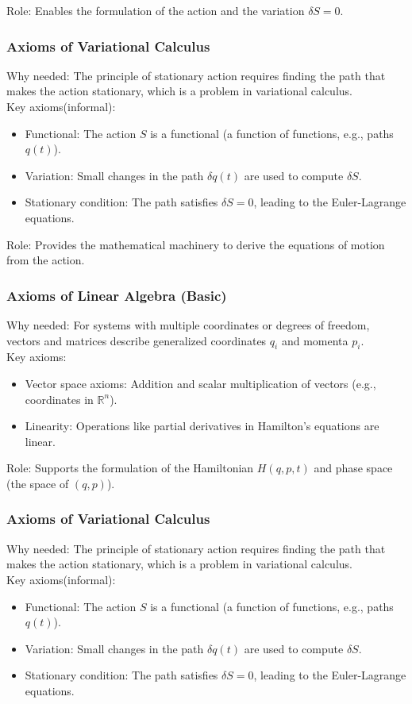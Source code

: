 Role: Enables the formulation of the action and the variation $ \delta S = 0 $.
\subsubsection{Axioms of Variational Calculus}
Why needed: The principle of stationary action requires finding the path that makes the action stationary, which is a problem in variational calculus.
\\
Key axioms(informal):
\begin{itemize}
    \item Functional: The action $ S $ is a functional (a function of functions, e.g., paths $ q(t) $).
    \item Variation: Small changes in the path $ \delta q(t) $ are used to compute $ \delta S $.
    \item Stationary condition: The path satisfies $ \delta S = 0 $, leading to the Euler-Lagrange equations.

\end{itemize}

Role: Provides the mathematical machinery to derive the equations of motion from the action.

\subsubsection{Axioms of Linear Algebra (Basic)}
Why needed: For systems with multiple coordinates or degrees of freedom, vectors and matrices describe generalized coordinates $ q_i $ and momenta $ p_i $.
\\
Key axioms:
\begin{itemize}
    \item Vector space axioms: Addition and scalar multiplication of vectors (e.g., coordinates in $ \mathbb{R}^n $).
    \item Linearity: Operations like partial derivatives in Hamilton’s equations are linear.


\end{itemize}
Role: Supports the formulation of the Hamiltonian $ H(q, p, t) $ and phase space (the space of $ (q, p) $).

\subsubsection{Axioms of Variational Calculus}
Why needed: The principle of stationary action requires finding the path that makes the action stationary, which is a problem in variational calculus.
\\
Key axioms(informal):
\begin{itemize}
    \item Functional: The action $ S $ is a functional (a function of functions, e.g., paths $ q(t) $).
    \item Variation: Small changes in the path $ \delta q(t) $ are used to compute $ \delta S $.
    \item Stationary condition: The path satisfies $ \delta S = 0 $, leading to the Euler-Lagrange equations.

\end{itemize}

